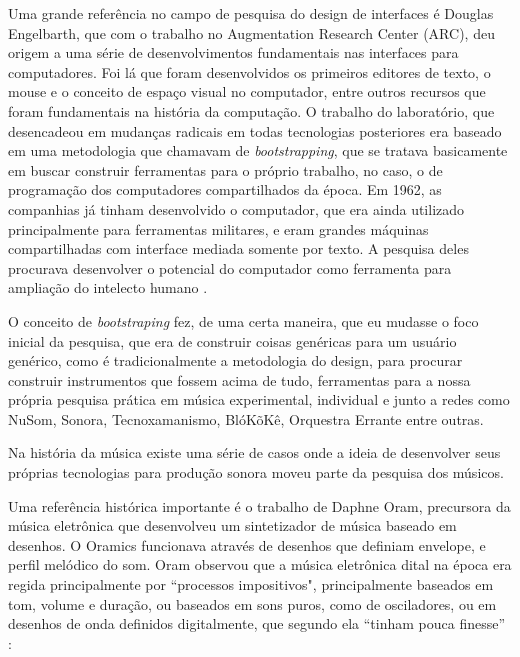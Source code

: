 Uma grande referência no campo de pesquisa do design de interfaces é Douglas Engelbarth, que com o trabalho no Augmentation Research Center (ARC), deu origem a uma série de desenvolvimentos fundamentais nas interfaces para computadores. Foi lá que foram desenvolvidos os primeiros editores de texto, o mouse e o conceito de espaço visual no computador, entre outros recursos que foram fundamentais na história da computação. O trabalho do laboratório, que desencadeou em mudanças radicais em todas tecnologias posteriores era baseado em uma metodologia que chamavam de \emph{bootstrapping}, que se tratava basicamente em buscar construir ferramentas para o próprio trabalho, no caso, o de programação dos computadores compartilhados da época. Em 1962, as companhias já tinham desenvolvido o computador, que era ainda utilizado principalmente para ferramentas militares, e eram grandes máquinas compartilhadas com interface mediada somente por texto. A pesquisa deles procurava desenvolver o potencial do computador como ferramenta para ampliação do intelecto humano \cite{Engelbart1962}.

O conceito de \emph{bootstraping} fez, de uma certa maneira, que eu mudasse o foco inicial da pesquisa, que era de construir coisas genéricas para um usuário genérico, como é tradicionalmente a metodologia do design, para procurar construir instrumentos que fossem acima de tudo, ferramentas para a nossa própria pesquisa prática em música experimental, individual e junto a redes como NuSom, Sonora, Tecnoxamanismo, BlóKõKê, Orquestra Errante entre outras.

Na história da música existe uma série de casos onde a ideia de desenvolver seus próprias tecnologias para produção sonora moveu parte da pesquisa dos músicos.

Uma referência histórica importante é o trabalho de Daphne Oram, precursora da música eletrônica que desenvolveu um sintetizador de música baseado em desenhos. O Oramics funcionava através de desenhos que definiam envelope, e perfil melódico do som. Oram observou que a música eletrônica dital na época era regida principalmente por ``processos impositivos", principalmente baseados em tom, volume e duração, ou baseados em sons puros, como de osciladores, ou em desenhos de onda definidos digitalmente, que segundo ela ``tinham pouca finesse'' \cite[101]{Oram1972}: 

